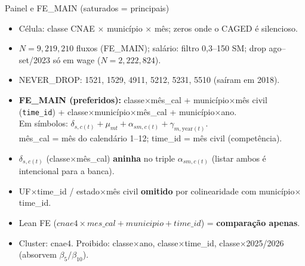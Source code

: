 \documentclass[aspectratio=169,11pt]{beamer}
\begin{document}
\begin{frame}{Painel e FE\_MAIN (saturados = principais)}
\begin{itemize}
  \item Célula: classe CNAE \(\times\) município \(\times\) mês; zeros onde o CAGED é silencioso.
  \item \(N=9{,}219{,}210\) fluxos (FE\_MAIN); salário: filtro 0,3--150 SM; drop ago--set/2023 só em wage (\(N=2{,}222{,}824\)).
  \item NEVER\_DROP: 1521, 1529, 4911, 5212, 5231, 5510 (saíram em 2018).
  \item \textbf{FE\_MAIN (preferidos):} classe\(\times\)mês\_cal + município\(\times\)mês civil (\texttt{time\_id}) + classe\(\times\)município\(\times\)mês\_cal + município\(\times\)ano.\\
        Em símbolos: \(\delta_{s,c(t)}+\mu_{mt}+\alpha_{sm,c(t)}+\gamma_{m,\mathrm{year}(t)}\).\\
        {\footnotesize mês\_cal = mês do calendário 1--12; time\_id = mês civil (competência).}
  \item \(\delta_{s,c(t)}\) (classe\(\times\)mês\_cal) \textbf{aninha} no triple \(\alpha_{sm,c(t)}\) (listar ambos é intencional para a banca).
  \item UF\(\times\)time\_id / estado\(\times\)mês civil \textbf{omitido} por colinearidade com município\(\times\)time\_id.
  \item Lean FE (\(cnae4\times mes\_cal + municipio + time\_id\)) = \textbf{comparação apenas}.
  \item Cluster: cnae4. Proibido: classe\(\times\)ano, classe\(\times\)time\_id, classe\(\times\)2025/2026 (absorvem \(\beta_5/\beta_{10}\)).
\end{itemize}
\end{frame}
\end{document}
